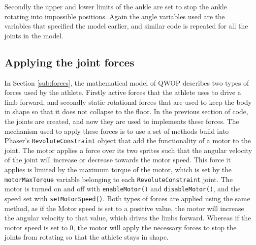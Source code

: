 \documentclass[12pt,a4paper,twoside,openright]{report}
\begin{document}
Secondly the upper and lower limits of the ankle are set to stop the ankle rotating into impossible positions. Again the angle variables used are the variables that specified the model earlier, and similar code is repeated for all the joints in the model.







\subsection{Applying the joint forces}
\label{sec:powerInPhysics}


In Section \ref{sub:forces}, the mathematical model of QWOP describes two types of forces used by the athlete. Firstly active forces that the athlete uses to drive a limb forward, and secondly static rotational forces that are used to keep the body in shape so that it does not collapse to the floor.
In the previous section of code, the joints are created, and now they are used to implements these forces.
The mechanism used to apply these forces is to use a set of methods build into Phaser's \texttt{RevoluteConstraint} object that add the functionality of a motor to the joint.
The motor applies a force over its two sprites such that the angular velocity of the joint will increase or decrease towards the motor speed. This force it applies is limited by the maximum torque of the motor, which is set by the \texttt{motorMaxTorque} variable belonging to each \texttt{RevoluteConstraint} joint.
The motor is turned on and off with \texttt{enableMotor()} and \texttt{disableMotor()}, and the speed set with \texttt{setMotorSpeed()}. Both types of forces are applied using the same method, as if the Motor speed is set to a positive value, the motor will increase the angular velocity to that value, which drives the limbs forward. Whereas if the motor speed is set to 0, the motor will apply the necessary forces to stop the joints from rotating so that the athlete stays in shape. 
\end{document}
